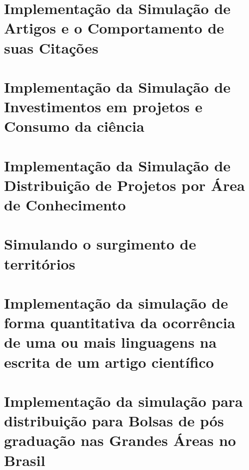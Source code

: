 \chapter{Implementação da Simulação de Artigos e o Comportamento de suas Citações}



\chapter{Implementação da Simulação de Investimentos em projetos e Consumo da ciência}




\chapter{Implementação da Simulação de Distribuição de Projetos por Área de Conhecimento}



\chapter{Simulando o surgimento de territórios}



\chapter{Implementação da simulação de forma quantitativa da ocorrência de uma ou mais linguagens na escrita de um artigo científico}



\chapter{Implementação da simulação para distribuição para Bolsas de pós graduação nas Grandes Áreas no Brasil}
    





